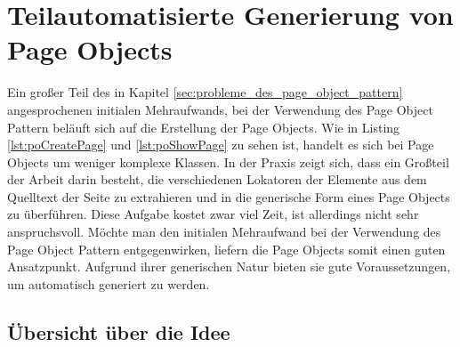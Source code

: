 
\chapter{Teilautomatisierte Generierung von Page Objects}
\label{sec:teilautomatisierte_generierung_von_pageObjects}

Ein großer Teil des in Kapitel \ref{sec:probleme_des_page_object_pattern} angesprochenen initialen Mehraufwands, bei der Verwendung des Page Object Pattern beläuft sich auf die Erstellung der Page Objects.
Wie in Listing \ref{lst:poCreatePage} und \ref{lst:poShowPage} zu sehen ist, handelt es sich bei Page Objects um weniger komplexe Klassen. In der Praxis zeigt sich, dass ein Großteil der Arbeit darin besteht, die verschiedenen Lokatoren der Elemente aus dem Quelltext der Seite zu extrahieren und in die generische Form eines Page Objects zu überführen.
Diese Aufgabe kostet zwar viel Zeit, ist allerdings nicht sehr anspruchsvoll.
Möchte man den initialen Mehraufwand bei der Verwendung des Page Object Pattern entgegenwirken, liefern die Page Objects somit einen guten Ansatzpunkt.
Aufgrund ihrer generischen Natur bieten sie gute Voraussetzungen, um automatisch generiert zu werden.
\section{Übersicht über die Idee}
\label{sec:uebersicht_ueber_idee}


